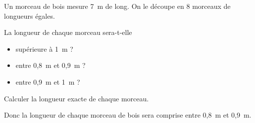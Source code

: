 \par Un morceau de bois mesure 7~m de long. On le découpe en 8 morceaux de longueurs égales.
\begin{myenumerate}
  \item La longueur de chaque morceau sera-t-elle
    \begin{itemize}
    \item supérieure à 1~m ?
    \item entre 0,8~m et 0,9~m ?
    \item entre 0,9~m et 1~m ?
    \end{itemize}
  \item Calculer la longueur exacte de chaque morceau.
\end{myenumerate}
\begin{myenumerate}
  \item
    \begin{multicols}{3}
      \par{}
      \par{}
    \end{multicols}
Donc la longueur de chaque morceau de bois sera comprise entre 0,8~m et 0,9~m.
\item\subitem{}\par{}
\end{myenumerate}